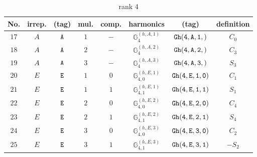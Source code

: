 \documentclass[fleqn,8pt]{jsarticle}
\begin{document}
\begin{table}[ht!]
\begin{center}
\caption{rank 4}
\renewcommand{\arraystretch}{1.3}
\begin{tabular}{cccccccc} \hline \hline
No. & irrep. & (tag) & mul. & comp. & harmonics & (tag) & definition \\ \hline
$ 17 $ & $ A $ & $ {\tt A} $ & $ 1 $ & $ - $ & $ \mathbb{G}_{4}^{(h,A,1)} $ & $ {\tt Gh(4,A,1,)} $ & $ C_{0} $ \\
$ 18 $ & $ A $ & $ {\tt A} $ & $ 2 $ & $ - $ & $ \mathbb{G}_{4}^{(h,A,2)} $ & $ {\tt Gh(4,A,2,)} $ & $ C_{3} $ \\
$ 19 $ & $ A $ & $ {\tt A} $ & $ 3 $ & $ - $ & $ \mathbb{G}_{4}^{(h,A,3)} $ & $ {\tt Gh(4,A,3,)} $ & $ S_{3} $ \\
$ 20 $ & $ E $ & $ {\tt E} $ & $ 1 $ & $ 0 $ & $ \mathbb{G}_{4,0}^{(h,E,1)} $ & $ {\tt Gh(4,E,1,0)} $ & $ C_{1} $ \\
$ 21 $ & $ E $ & $ {\tt E} $ & $ 1 $ & $ 1 $ & $ \mathbb{G}_{4,1}^{(h,E,1)} $ & $ {\tt Gh(4,E,1,1)} $ & $ S_{1} $ \\
$ 22 $ & $ E $ & $ {\tt E} $ & $ 2 $ & $ 0 $ & $ \mathbb{G}_{4,0}^{(h,E,2)} $ & $ {\tt Gh(4,E,2,0)} $ & $ C_{4} $ \\
$ 23 $ & $ E $ & $ {\tt E} $ & $ 2 $ & $ 1 $ & $ \mathbb{G}_{4,1}^{(h,E,2)} $ & $ {\tt Gh(4,E,2,1)} $ & $ S_{4} $ \\
$ 24 $ & $ E $ & $ {\tt E} $ & $ 3 $ & $ 0 $ & $ \mathbb{G}_{4,0}^{(h,E,3)} $ & $ {\tt Gh(4,E,3,0)} $ & $ C_{2} $ \\
$ 25 $ & $ E $ & $ {\tt E} $ & $ 3 $ & $ 1 $ & $ \mathbb{G}_{4,1}^{(h,E,3)} $ & $ {\tt Gh(4,E,3,1)} $ & $ - S_{2} $ \\
 \hline \hline
\end{tabular}
\end{center}
\end{table}
\end{document}
